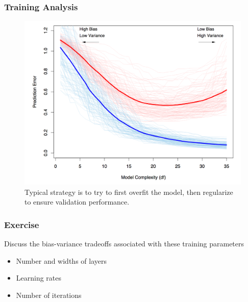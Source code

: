 \documentclass[10pt,mathserif]{beamer}
\begin{document}
\begin{frame}
  \frametitle{Training Analysis}
  \begin{figure}[ht]
    \centering
    \includegraphics[width=0.7\paperwidth]{figure/bias_variance}
    \caption{Typical strategy is to try to first overfit the model, then
      regularize to ensure validation performance. \label{fig:bias_variance} }
  \end{figure}
\end{frame}

\begin{frame}
  \frametitle{Exercise}
  Discuss the bias-variance tradeoffs associated with these training parameters
  \begin{itemize}
    \item Number and widths of layers
    \item Learning rates
    \item Number of iterations
  \end{itemize}
\end{frame}
\end{document}

